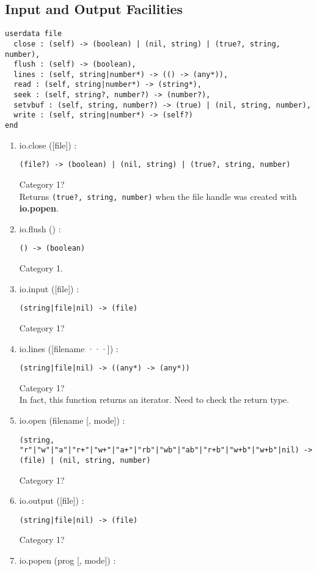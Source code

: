\documentclass{paper}
\begin{document}
\subsection{Input and Output Facilities}

\begin{verbatim}
userdata file
  close : (self) -> (boolean) | (nil, string) | (true?, string, number),
  flush : (self) -> (boolean),
  lines : (self, string|number*) -> (() -> (any*)),
  read : (self, string|number*) -> (string*),
  seek : (self, string?, number?) -> (number?),
  setvbuf : (self, string, number?) -> (true) | (nil, string, number),
  write : (self, string|number*) -> (self?)
end
\end{verbatim}

\begin{enumerate}
\item io.close ([file]) :
\begin{verbatim}
(file?) -> (boolean) | (nil, string) | (true?, string, number)
\end{verbatim}
Category 1?
\\
Returns \texttt{(true?, string, number)} when the file handle
was created with \textbf{io.popen}.
\item io.flush () :
\begin{verbatim}
() -> (boolean)
\end{verbatim}
Category 1.
\item io.input ([file]) :
\begin{verbatim}
(string|file|nil) -> (file)
\end{verbatim}
Category 1?
\item io.lines ([filename ···]) :
\begin{verbatim}
(string|file|nil) -> ((any*) -> (any*))
\end{verbatim}
Category 1?
\\
In fact, this function returns an iterator. Need to check the return type.
\item io.open (filename [, mode]) :
\begin{verbatim}
(string,
"r"|"w"|"a"|"r+"|"w+"|"a+"|"rb"|"wb"|"ab"|"r+b"|"w+b"|"w+b"|nil) ->
(file) | (nil, string, number)
\end{verbatim}
Category 1?
\item io.output ([file]) :
\begin{verbatim}
(string|file|nil) -> (file)
\end{verbatim}
Category 1?
\item io.popen (prog [, mode]) :

\end{enumerate}
\end{document}
